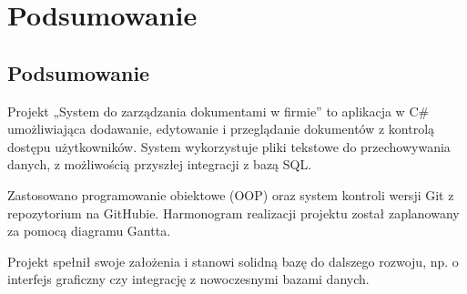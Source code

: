 ﻿%
\chapter{Podsumowanie}

\section{Podsumowanie}
Projekt „System do zarządzania dokumentami w firmie” to aplikacja w {C\#} umożliwiająca dodawanie, edytowanie i przeglądanie dokumentów z kontrolą dostępu użytkowników. System wykorzystuje pliki tekstowe do przechowywania danych, z możliwością przyszłej integracji z bazą SQL.

Zastosowano programowanie obiektowe (OOP) oraz system kontroli wersji Git z repozytorium na GitHubie. Harmonogram realizacji projektu został zaplanowany za pomocą diagramu Gantta.

Projekt spełnił swoje założenia i stanowi solidną bazę do dalszego rozwoju, np. o interfejs graficzny czy integrację z nowoczesnymi bazami danych.




